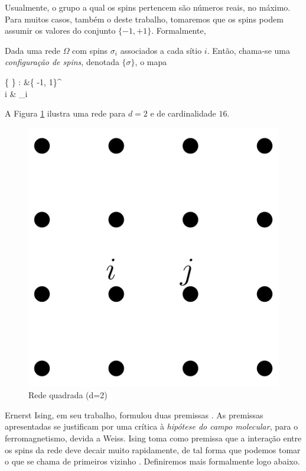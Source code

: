 Usualmente, o grupo a qual os spins pertencem são números reais, no máximo. Para muitos casos, também o deste trabalho, tomaremos que os spins podem assumir os valores do conjunto $\{-1, +1\}$. Formalmente,

\begin{definition}
	Dada uma rede $\Omega$ com spins $\sigma_i$ associados a cada sítio $i$. Então, chama-se uma \textit{configuração de spins}, denotada $\{ \sigma \}$, o mapa 
	\begin{flalign*}
		\{ \sigma \} : \Omega &\to \{ -1, 1\}^{\abs{\Omega}} \\
		i & \mapsto \sigma_i 
	\end{flalign*}
\end{definition}

A Figura \ref{fig:II.1} ilustra uma rede para $d = 2$ e de cardinalidade $16$. 

\begin{figure}[h]
	\center
	\includegraphics[scale=.2]{rede2d.png}
	\caption{Rede quadrada (d=2)}
	\label{fig:II.1}
\end{figure}

Ernerst Ising, em seu trabalho, formulou duas premissas \cite{Ising}. As premissas apresentadas se justificam por uma crítica à \textit{hipótese do campo molecular}, para o ferromagnetismo, devida a Weiss. Ising toma como premissa que a interação entre os spins da rede deve decair muito rapidamente, de tal forma que podemos tomar o que se chama de primeiros vizinho \cite{Ising}. Definiremos mais formalmente logo abaixo.

